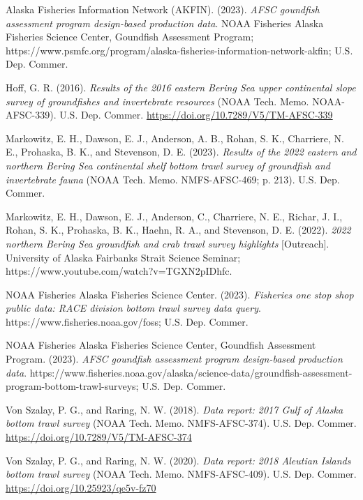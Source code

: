 \documentclass[
  letterpaper,
  oneside,
  open=any]{scrbook}
\newlength{\cslhangindent}
\newlength{\cslentryspacingunit} %
\newenvironment{CSLReferences}[2] %
 {%
  \setlength{\parindent}{0pt}
  \ifodd #1
  \let\oldpar\par
  \def\par{\hangindent=\cslhangindent\oldpar}
  \fi
  \setlength{\parskip}{#2\cslentryspacingunit}
 }%
 {}
\begin{document}
\hypertarget{refs}{}
\begin{CSLReferences}{1}{0}
\leavevmode{}%
Alaska Fisheries Information Network (AKFIN). (2023). \emph{AFSC
goundfish assessment program design-based production data}. {NOAA
Fisheries Alaska Fisheries Science Center, Goundfish Assessment
Program};
https://www.psmfc.org/program/alaska-fisheries-information-network-akfin;
{U.S. Dep. Commer.}

\leavevmode{}%
Hoff, G. R. (2016). \emph{Results of the 2016 eastern {Bering Sea} upper
continental slope survey of groundfishes and invertebrate resources}
(NOAA Tech. Memo. NOAA-AFSC-339). {U.S. Dep. Commer.}
\url{https://doi.org/10.7289/V5/TM-AFSC-339}

\leavevmode{}%
Markowitz, E. H., Dawson, E. J., Anderson, A. B., Rohan, S. K.,
Charriere, N. E., Prohaska, B. K., and Stevenson, D. E. (2023).
\emph{Results of the 2022 eastern and northern {Bering Sea} continental
shelf bottom trawl survey of groundfish and invertebrate fauna} (NOAA
Tech. Memo. NMFS-AFSC-469; p. 213). {U.S. Dep. Commer.}

\leavevmode{}%
Markowitz, E. H., Dawson, E. J., Anderson, C., Charriere, N. E., Richar,
J. I., Rohan, S. K., Prohaska, B. K., Haehn, R. A., and Stevenson, D. E.
(2022). \emph{2022 northern {Bering Sea} groundfish and crab trawl
survey highlights} {[}Outreach{]}. University of Alaska Fairbanks Strait
Science Seminar; https://www.youtube.com/watch?v=TGXN2pIDhfc.

\leavevmode{}%
NOAA Fisheries Alaska Fisheries Science Center. (2023). \emph{Fisheries
one stop shop public data: RACE division bottom trawl survey data
query}. https://www.fisheries.noaa.gov/foss; {U.S. Dep. Commer.}

\leavevmode{}%
NOAA Fisheries Alaska Fisheries Science Center, Goundfish Assessment
Program. (2023). \emph{AFSC goundfish assessment program design-based
production data}.
https://www.fisheries.noaa.gov/alaska/science-data/groundfish-assessment-program-bottom-trawl-surveys;
{U.S. Dep. Commer.}

\leavevmode{}%
Von Szalay, P. G., and Raring, N. W. (2018). \emph{Data report: 2017
{Gulf of Alaska} bottom trawl survey} (NOAA Tech. Memo. NMFS-AFSC-374).
{U.S. Dep. Commer.} \url{https://doi.org/10.7289/V5/TM-AFSC-374}

\leavevmode{}%
Von Szalay, P. G., and Raring, N. W. (2020). \emph{Data report: 2018
{Aleutian Islands} bottom trawl survey} (NOAA Tech. Memo.
NMFS-AFSC-409). {U.S. Dep. Commer.}
\url{https://doi.org/10.25923/qe5v-fz70}

\end{CSLReferences}
\end{document}
